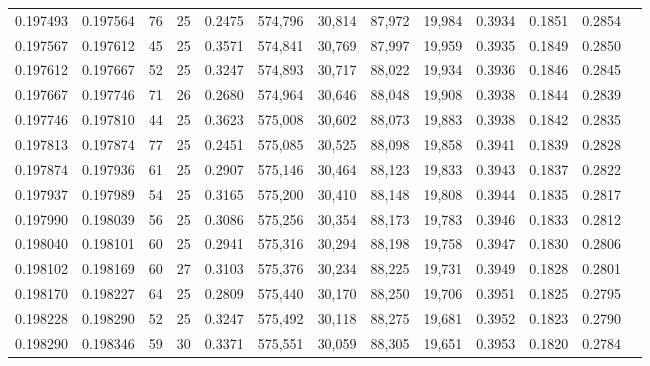 \begin{tabular}{rrrrrrrrrrrrr}
0.197493 & 0.197564 &  76 &  25 &                                     0.2475 & 574,796 &  30,814 &  87,972 &  19,984 & 0.3934 & 0.1851 & 0.2854 \\
0.197567 & 0.197612 &  45 &  25 &                                     0.3571 & 574,841 &  30,769 &  87,997 &  19,959 & 0.3935 & 0.1849 & 0.2850 \\
0.197612 & 0.197667 &  52 &  25 &                                     0.3247 & 574,893 &  30,717 &  88,022 &  19,934 & 0.3936 & 0.1846 & 0.2845 \\
0.197667 & 0.197746 &  71 &  26 &                                     0.2680 & 574,964 &  30,646 &  88,048 &  19,908 & 0.3938 & 0.1844 & 0.2839 \\
0.197746 & 0.197810 &  44 &  25 &                                     0.3623 & 575,008 &  30,602 &  88,073 &  19,883 & 0.3938 & 0.1842 & 0.2835 \\
0.197813 & 0.197874 &  77 &  25 &                                     0.2451 & 575,085 &  30,525 &  88,098 &  19,858 & 0.3941 & 0.1839 & 0.2828 \\
0.197874 & 0.197936 &  61 &  25 &                                     0.2907 & 575,146 &  30,464 &  88,123 &  19,833 & 0.3943 & 0.1837 & 0.2822 \\
0.197937 & 0.197989 &  54 &  25 &                                     0.3165 & 575,200 &  30,410 &  88,148 &  19,808 & 0.3944 & 0.1835 & 0.2817 \\
0.197990 & 0.198039 &  56 &  25 &                                     0.3086 & 575,256 &  30,354 &  88,173 &  19,783 & 0.3946 & 0.1833 & 0.2812 \\
0.198040 & 0.198101 &  60 &  25 &                                     0.2941 & 575,316 &  30,294 &  88,198 &  19,758 & 0.3947 & 0.1830 & 0.2806 \\
0.198102 & 0.198169 &  60 &  27 &                                     0.3103 & 575,376 &  30,234 &  88,225 &  19,731 & 0.3949 & 0.1828 & 0.2801 \\
0.198170 & 0.198227 &  64 &  25 &                                     0.2809 & 575,440 &  30,170 &  88,250 &  19,706 & 0.3951 & 0.1825 & 0.2795 \\
0.198228 & 0.198290 &  52 &  25 &                                     0.3247 & 575,492 &  30,118 &  88,275 &  19,681 & 0.3952 & 0.1823 & 0.2790 \\
0.198290 & 0.198346 &  59 &  30 &                                     0.3371 & 575,551 &  30,059 &  88,305 &  19,651 & 0.3953 & 0.1820 & 0.2784 \\

\end{tabular}

